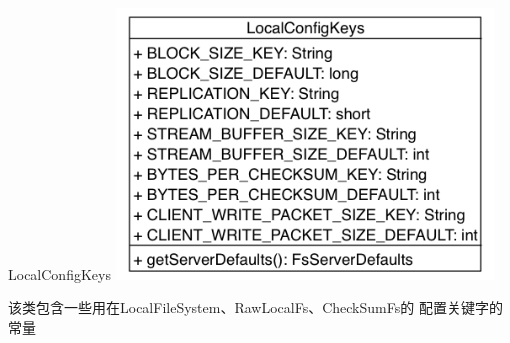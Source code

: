 \begin{XeClass}{LocalConfigKeys}
\includegraphics[width=10cm]{cdig/LocalConfigKeys.png}
     
 该类包含一些用在LocalFileSystem、RawLocalFs、CheckSumFs的
 配置关键字的常量

\end{XeClass}
